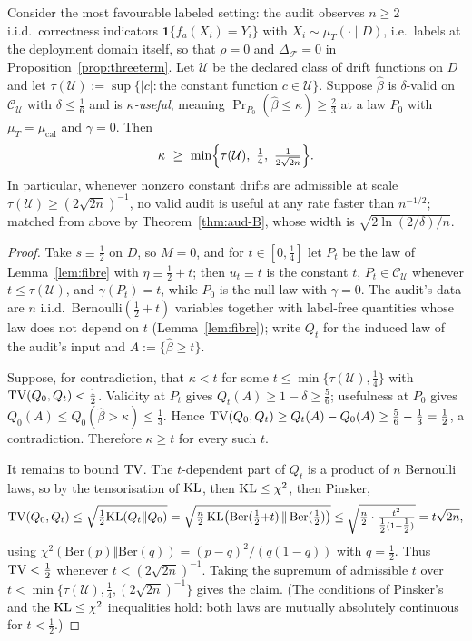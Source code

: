 \begin{theorem}\label{thm:lecam}
Consider the most favourable labeled setting: the audit observes $n\ge2$ i.i.d.\ correctness
indicators $\mathbf 1\{f_a(X_i)=Y_i\}$ with $X_i\sim\mu_T(\cdot\mid D)$, i.e.\ labels at the
deployment domain itself, so that $\rho=0$ and $\Delta_{\mathcal F}=0$ in
Proposition~\ref{prop:threeterm}. Let $\mathcal U$ be the declared class of drift functions
on $D$ and let $\tau(\mathcal U):=\sup\{|c|:\text{the constant function }c\in\mathcal U\}$.
Suppose $\widehat\beta$ is $\delta$-valid on $\mathcal C_{\mathcal U}$ with $\delta\le\tfrac16$
and is \emph{$\kappa$-useful}, meaning $\Pr_{P_0}(\widehat\beta\le\kappa)\ge\tfrac23$ at a law
$P_0$ with $\mu_T=\mu_{\mathrm{cal}}$ and $\gamma=0$. Then
\[
\kappa\ \ge\ \min\Bigl\{\tau(\mathcal U),\ \tfrac{1}{4},\ \tfrac{1}{2\sqrt{2n}}\Bigr\}.
\]
In particular, whenever nonzero constant drifts are admissible at scale
$\tau(\mathcal U)\ge(2\sqrt{2n})^{-1}$, no valid audit is useful at any rate faster than
$n^{-1/2}$; matched from above by Theorem~\ref{thm:aud-B}, whose width is
$\sqrt{2\ln(2/\delta)/n}$.
\end{theorem}
\begin{proof}
Take $s\equiv\tfrac12$ on $D$, so $M=0$, and for $t\in[0,\tfrac14]$ let $P_t$ be the law of
Lemma~\ref{lem:fibre} with $\eta\equiv\tfrac12+t$; then $u_t\equiv t$ is the constant $t$,
$P_t\in\mathcal C_{\mathcal U}$ whenever $t\le\tau(\mathcal U)$, and $\gamma(P_t)=t$, while
$P_0$ is the null law with $\gamma=0$. The audit's data are $n$ i.i.d.\
$\mathrm{Bernoulli}(\tfrac12+t)$ variables together with label-free quantities whose law does
not depend on $t$ (Lemma~\ref{lem:fibre}); write $Q_t$ for the induced law of the audit's
input and $A:=\{\widehat\beta\ge t\}$.

Suppose, for contradiction, that $\kappa<t$ for some $t\le\min\{\tau(\mathcal U),\tfrac14\}$
with $\mathrm{TV}(Q_0,Q_t)<\tfrac12$. Validity at $P_t$ gives $Q_t(A)\ge1-\delta\ge\tfrac56$;
usefulness at $P_0$ gives $Q_0(A)\le Q_0(\widehat\beta>\kappa)\le\tfrac13$. Hence
$\mathrm{TV}(Q_0,Q_t)\ge Q_t(A)-Q_0(A)\ge\tfrac56-\tfrac13=\tfrac12$, a contradiction. Therefore
$\kappa\ge t$ for every such $t$.

It remains to bound $\mathrm{TV}$. The $t$-dependent part of $Q_t$ is a product of $n$ Bernoulli laws,
so by the tensorisation of $\mathrm{KL}$, then $\mathrm{KL}\le\chi^2$, then Pinsker,
\[
\mathrm{TV}(Q_0,Q_t)\le\sqrt{\tfrac12\mathrm{KL}(Q_t\Vert Q_0)}
=\sqrt{\tfrac{n}{2}\,\mathrm{KL}\bigl(\mathrm{Ber}(\tfrac12{+}t)\,\Vert\,\mathrm{Ber}(\tfrac12)\bigr)}
\le\sqrt{\tfrac{n}{2}\cdot\tfrac{t^2}{\tfrac12(1-\tfrac12)}}=t\sqrt{2n},
\]
using $\chi^2(\mathrm{Ber}(p)\Vert\mathrm{Ber}(q))=(p-q)^2/(q(1-q))$ with $q=\tfrac12$. Thus
$\mathrm{TV}<\tfrac12$ whenever $t<(2\sqrt{2n})^{-1}$. Taking the supremum of admissible $t$ over
$t<\min\{\tau(\mathcal U),\tfrac14,(2\sqrt{2n})^{-1}\}$ gives the claim.
(The conditions of Pinsker's and the $\mathrm{KL}\le\chi^2$ inequalities hold: both laws are
mutually absolutely continuous for $t<\tfrac12$.)
\end{proof}

